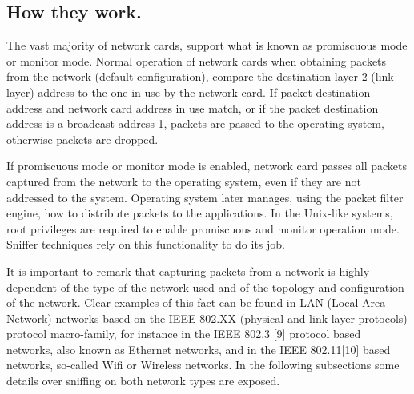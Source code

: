 \documentclass[thesis=M,english]{FITthesis}[2011/07/15]
\begin{document}
\subsection{How they work.}
The vast majority of network cards, support what is known as promiscuous mode or monitor mode. Normal operation of network cards when obtaining packets from the network (default configuration), compare the destination layer 2 (link layer) address to the one in use by the network card. If packet destination address and network card address in use match, or if the packet destination address is a broadcast address 1, packets are passed to the operating system, otherwise packets are dropped.

If promiscuous mode or monitor mode is enabled, network card passes all packets captured from the network to the operating system, even if they are not addressed to the system. Operating system later manages, using the packet filter engine, how to distribute packets to the applications. In the Unix-like systems, root privileges are required to enable promiscuous and monitor operation mode. Sniffer techniques rely on this functionality to do its job.

It is important to remark that capturing packets from a network is highly dependent of the type of the network used and of the topology and configuration of the network. Clear examples of this fact can be found in LAN (Local Area Network) networks based on the IEEE 802.XX (physical and link layer protocols) protocol macro-family, for instance in the IEEE 802.3 [9] protocol based networks, also known as Ethernet networks, and in the IEEE 802.11[10] based networks, so-called Wifi or Wireless networks. In the following subsections some details over sniffing on both network types are exposed.
\end{document}
